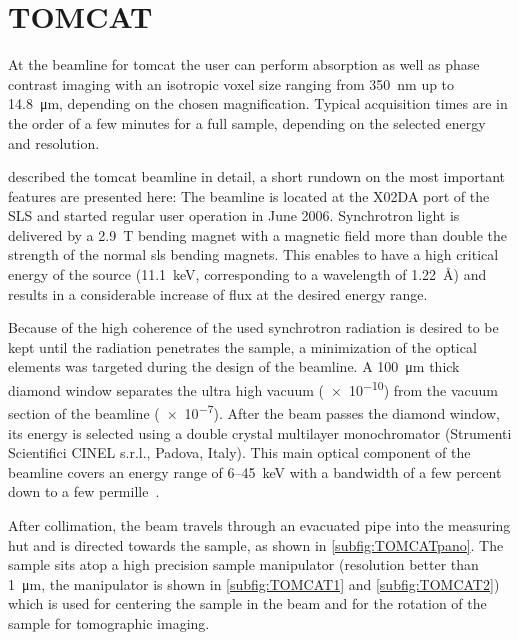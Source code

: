 \section{TOMCAT}\label{sec:tomcat}
At the beamline for \acf{tomcat} the user can perform absorption as well as phase contrast imaging with an isotropic voxel size ranging from \SI{350}{\nano\meter} up to \SI{14.8}{\micro\meter}, depending on the chosen magnification. Typical acquisition times are in the order of a few minutes for a full sample, depending on the selected energy and resolution.

\citet{Stampanoni2006a} described the \ac{tomcat} beamline in detail, a short rundown on the most important features are presented here: The beamline is located at the X02DA port of the SLS and started regular user operation in June 2006. Synchrotron light is delivered by a \SI{2.9}{\tesla} bending magnet with a magnetic field more than double the strength of the normal \ac{sls} bending magnets. This enables to have a high critical energy of the source (\SI{11.1}{\kilo\electronvolt}, corresponding to a wavelength of \SI{1.22}{\angstrom}) and results in a considerable increase of flux at the desired energy range.

Because of the high coherence of the used synchrotron radiation is desired to be kept until the radiation penetrates the sample, a minimization of the optical elements was targeted during the design of the beamline. A \SI{100}{\micro\meter} thick diamond window separates the ultra high vacuum (\SI{e-10}{\millibar}) from the vacuum section of the beamline (\SI{e-7}{\millibar}). After the beam passes the diamond window, its energy is selected using a double crystal multilayer monochromator (Strumenti Scientifici CINEL s.r.l., Padova, Italy). This main optical component of the beamline covers an energy range of 6--\SI{45}{\kilo\electronvolt} with a bandwidth of a few percent down to a few permille~\cite{Stampanoni2006a}.

After collimation, the beam travels through an evacuated pipe into the measuring hut and is directed towards the sample, as shown in \autoref{subfig:TOMCATpano}. The sample sits atop a high precision sample manipulator (resolution better than \SI{1}{\micro\meter}, the manipulator is shown in \autoref{subfig:TOMCAT1} and \ref{subfig:TOMCAT2}) which is used for centering the sample in the beam and for the rotation of the sample for tomographic imaging. 

